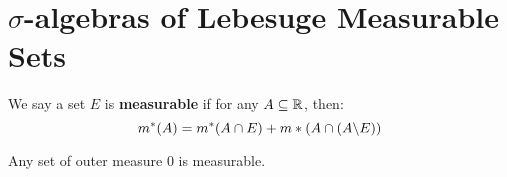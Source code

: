 
\section{$\sigma$-algebras of Lebesuge Measurable Sets}

\begin{definition}
    We say a set $E$ is  \textbf{measurable} if for any $A \subseteq \mathbb{R}$, then:
    \begin{equation*}
        m^*(A)=m^*(A \cap E)+m*(A \cap (A \backslash E))
    \end{equation*}
\end{definition}

\begin{lemma}\label{}
    Any set of outer measure $0$ is measurable.
\end{lemma}
